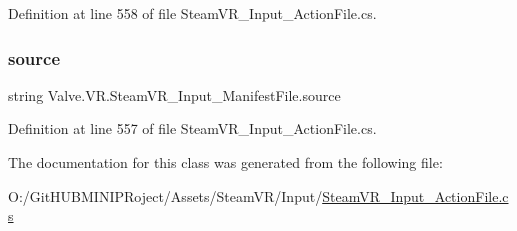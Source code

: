 Definition at line 558 of file Steam\+V\+R\+\_\+\+Input\+\_\+\+Action\+File.\+cs.

\mbox{\label{class_valve_1_1_v_r_1_1_steam_v_r___input___manifest_file_a0c1eeea5a4915ff8a36d2eb35450afac}} 
\subsubsection{\texorpdfstring{source}{source}}
{\footnotesize\ttfamily string Valve.\+V\+R.\+Steam\+V\+R\+\_\+\+Input\+\_\+\+Manifest\+File.\+source}



Definition at line 557 of file Steam\+V\+R\+\_\+\+Input\+\_\+\+Action\+File.\+cs.



The documentation for this class was generated from the following file\+:\begin{DoxyCompactItemize}
\item 
O\+:/\+Git\+H\+U\+B\+M\+I\+N\+I\+P\+Roject/\+Assets/\+Steam\+V\+R/\+Input/\mbox{\hyperlink{_steam_v_r___input___action_file_8cs}{Steam\+V\+R\+\_\+\+Input\+\_\+\+Action\+File.\+cs}}\end{DoxyCompactItemize}
